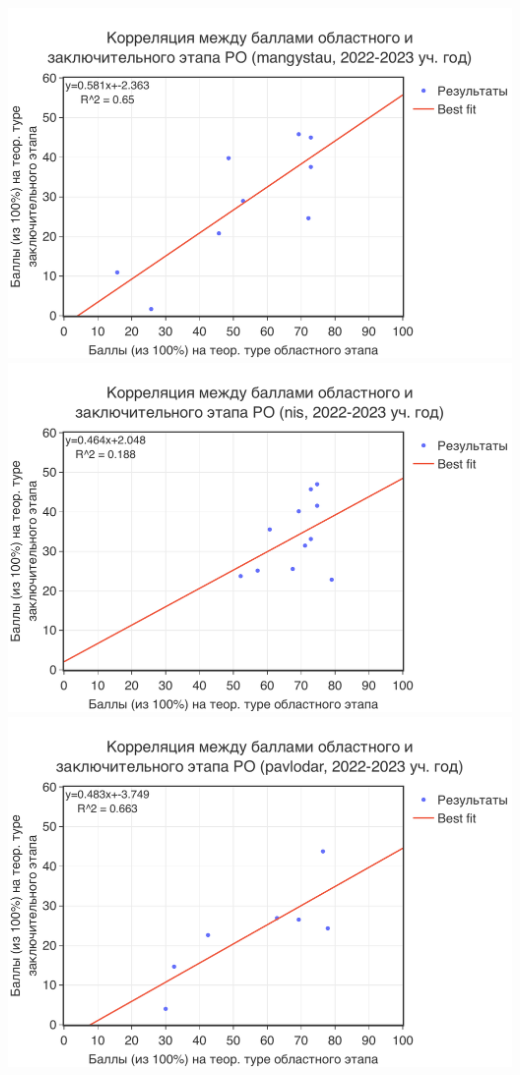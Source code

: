 \includegraphics[width=\linewidth]{../export/pdf/trajectory/obl-mangystau.pdf}
\includegraphics[width=\linewidth]{../export/pdf/trajectory/obl-nis.pdf}
\includegraphics[width=\linewidth]{../export/pdf/trajectory/obl-pavlodar.pdf}

